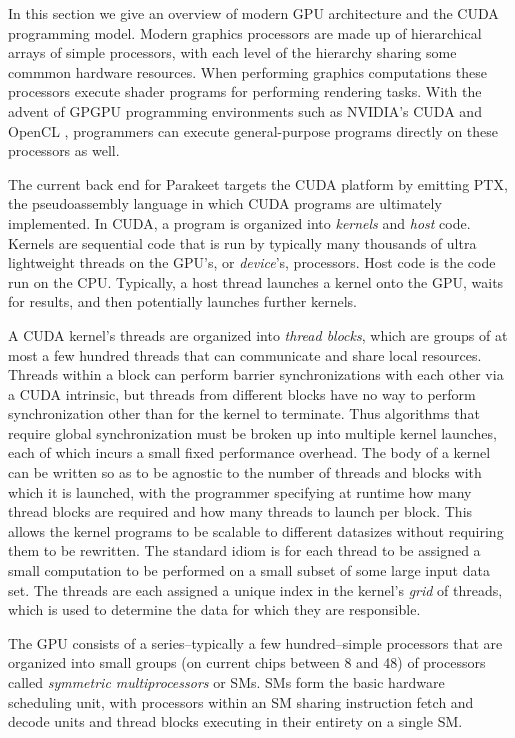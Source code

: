 \documentclass[preprint]{sigplanconf}
\begin{document}
In this section we give an overview of modern GPU architecture and the CUDA
programming model.  Modern graphics processors are made up of hierarchical
arrays of simple processors, with each level of the hierarchy sharing some
commmon hardware resources.  When performing graphics computations these
processors execute shader programs for performing rendering tasks.  With the
advent of GPGPU programming environments such as NVIDIA's CUDA \cite{NvidCU} and
OpenCL \cite{Muns10}, programmers can execute general-purpose programs directly
on these processors as well.

The current back end for Parakeet targets the CUDA platform by emitting PTX, the
pseudoassembly language in which CUDA programs are ultimately implemented.
In CUDA, a program is organized into {\it kernels} and {\it host} code.
Kernels are sequential code that is run by typically many thousands of ultra
lightweight threads on the GPU's, or {\it device}'s, processors.  Host code is
the code run on the CPU. Typically, a host thread launches a kernel onto the
GPU, waits for results, and then potentially launches further kernels.

A CUDA kernel's threads are organized into {\it thread blocks}, which are groups
of at most a few hundred threads that can communicate and share local resources.
Threads within a block can perform barrier synchronizations with each other via
a CUDA intrinsic, but threads from different blocks have no way to perform
synchronization other than for the kernel to terminate.  Thus algorithms that
require global synchronization must be broken up into multiple kernel launches,
each of which incurs a small fixed performance overhead.  The body of a
kernel can be written so as to be agnostic to the number of threads and
blocks with which it is launched, with the programmer specifying at runtime how
many thread blocks are required and how many threads to launch per block. This
allows the kernel programs to be scalable to different datasizes without
requiring them to be rewritten. The standard idiom is for each thread to be
assigned a small computation to be performed on a small subset of some large
input data set.  The threads are each assigned a unique index in the kernel's
{\it grid} of threads, which is used to determine the data for which they are
responsible.

The GPU consists of a series--typically a few hundred--simple processors that
are organized into small groups (on current chips between 8 and 48) of
processors called {\it symmetric multiprocessors} or SMs.  SMs form the basic
hardware scheduling unit, with processors within an SM sharing instruction
fetch and decode units and thread blocks executing in their entirety on a
single SM.
\end{document}
